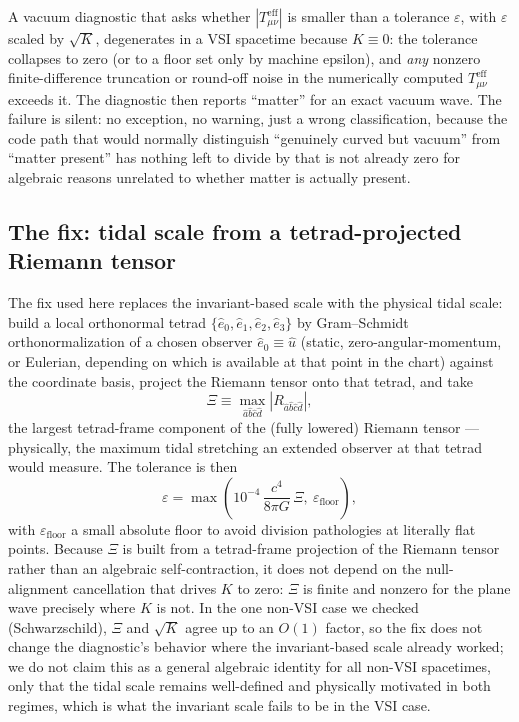 \documentclass[aps,onecolumn,10pt,nofootinbib]{revtex4-2}
\begin{document}
A vacuum diagnostic that asks whether $|T^{\text{eff}}_{\mu\nu}|$ is
smaller than a tolerance $\varepsilon$, with $\varepsilon$ scaled by
$\sqrt{K}$, degenerates in a VSI spacetime because $K \equiv 0$: the
tolerance collapses to zero (or to a floor set only by machine epsilon),
and \emph{any} nonzero finite-difference truncation or round-off noise in
the numerically computed $T^{\text{eff}}_{\mu\nu}$ exceeds it. The
diagnostic then reports ``matter'' for an exact vacuum wave. The failure is
silent: no exception, no warning, just a wrong classification, because the
code path that would normally distinguish ``genuinely curved but vacuum''
from ``matter present'' has nothing left to divide by that is not already
zero for algebraic reasons unrelated to whether matter is actually present.

\subsection{The fix: tidal scale from a tetrad-projected Riemann tensor}
\label{sec:vsi-fix}

The fix used here replaces the invariant-based scale with the physical
tidal scale: build a local orthonormal tetrad $\{\hat e_0, \hat e_1, \hat
e_2, \hat e_3\}$ by Gram--Schmidt orthonormalization of a chosen observer
$\hat e_0 \equiv \hat u$ (static, zero-angular-momentum, or Eulerian,
depending on which is available at that point in the chart) against the
coordinate basis, project the Riemann tensor onto that tetrad, and take
\begin{equation}
  \Xi \equiv \max_{\hat a \hat b \hat c \hat d}
    \left| R_{\hat a \hat b \hat c \hat d} \right|,
\end{equation}
the largest tetrad-frame component of the (fully lowered) Riemann tensor —
physically, the maximum tidal stretching an extended observer at that
tetrad would measure. The tolerance is then
\begin{equation}
  \varepsilon = \max\!\left(10^{-4}\,\frac{c^4}{8\pi G}\,\Xi,\ \varepsilon_{\text{floor}}\right),
\end{equation}
with $\varepsilon_{\text{floor}}$ a small absolute floor to avoid division
pathologies at literally flat points. Because $\Xi$ is built from a
tetrad-frame projection of the Riemann tensor rather than an algebraic
self-contraction, it does not depend on the null-alignment cancellation
that drives $K$ to zero: $\Xi$ is finite and nonzero for the plane wave
precisely where $K$ is not. In the one non-VSI case we checked
(Schwarzschild), $\Xi$ and $\sqrt{K}$ agree up to an $O(1)$ factor, so the
fix does not change the diagnostic's behavior where the invariant-based
scale already worked; we do not claim this as a general algebraic identity
for all non-VSI spacetimes, only that the tidal scale remains well-defined
and physically motivated in both regimes, which is what the invariant
scale fails to be in the VSI case.
\end{document}
